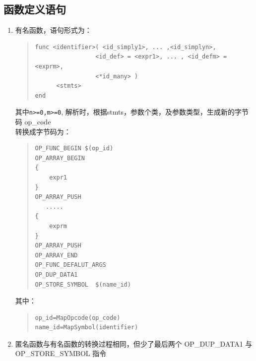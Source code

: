 \subsection{函数定义语句}
\begin{enumerate}
\item 有名函数，语句形式为：
\begin{quote}
\begin{verbatim}
func <identifier>( <id_simply1>, ... ,<id_simplyn>,
                 <id_def> = <expr1>, ... , <id_defm> = <exprm>,
                 <*id_many> )
      <stmts>
end 
\end{verbatim}
\end{quote}
其中\verb|n>=0,m>=0|, 解析时，根据stmts，参数个类，及参数类型，生成新的字节码 op\_code \\
转换成字节码为：
\begin{quote}
\begin{verbatim}
OP_FUNC_BEGIN $(op_id)
OP_ARRAY_BEGIN
{
    expr1
}
OP_ARRAY_PUSH
   .....
{
    exprm
}
OP_ARRAY_PUSH
OP_ARRAY_END
OP_FUNC_DEFALUT_ARGS
OP_DUP_DATA1
OP_STORE_SYMBOL  $(name_id)
\end{verbatim}
\end{quote}
其中：
\begin{quote}
\begin{verbatim}
op_id=MapOpcode(op_code) 
name_id=MapSymbol(identifier)
\end{verbatim}
\end{quote}
\item 匿名函数与有名函数的转换过程相同，但少了最后两个 OP\_DUP\_DATA1 与 OP\_STORE\_SYMBOL 指令
\end{enumerate}

